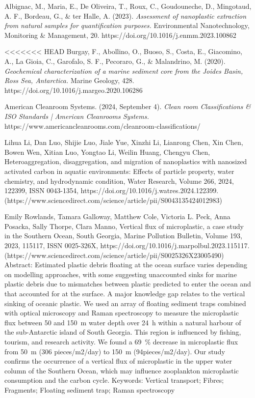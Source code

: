 \documentclass[twocolumn,a4paper,aps,amsmath,amssymb,floatfix,superscriptaddress]{revtex4-2}
\begin{document}
	\begin{thebibliography}{10}
		
		Albignac, M., Maria, E., De Oliveira, T., Roux, C., Goudouneche, D., Mingotaud, A. F., Bordeau, G., \& ter Halle, A. (2023). \textit{Assessment of nanoplastic extraction from natural samples for quantification purposes.} Environmental Nanotechnology, Monitoring \& Management, 20. https://doi.org/10.1016/j.enmm.2023.100862
		
<<<<<<< HEAD
		Burgay, F., Abollino, O., Buoso, S., Costa, E., Giacomino, A., La Gioia, C., Garofalo, S. F., Pecoraro, G., \& Malandrino, M. (2020). \textit{Geochemical characterization of a marine sediment core from the Joides Basin, Ross Sea, Antarctica.} Marine Geology, 428. https://doi.org/10.1016/j.margeo.2020.106286 
				
		American Cleanroom Systems. (2024, September 4). \textit{Clean room Classifications \& ISO Standards | American Cleanrooms Systems.} https://www.americancleanrooms.com/cleanroom-classifications/
		
		Lihua Li, Dan Luo, Shijie Luo, Jiale Yue, Xinzhi Li, Lianrong Chen, Xin Chen, Bowen Wen, Xitian Luo, Yongtao Li, Weilin Huang, Chengyu Chen,
		Heteroaggregation, disaggregation, and migration of nanoplastics with nanosized activated carbon in aquatic environments: Effects of particle property, water chemistry, and hydrodynamic condition,
		Water Research,
		Volume 266,
		2024,
		122399,
		ISSN 0043-1354,
		https://doi.org/10.1016/j.watres.2024.122399.
		(https://www.sciencedirect.com/science/article/pii/S0043135424012983)
		
		Emily Rowlands, Tamara Galloway, Matthew Cole, Victoria L. Peck, Anna Posacka, Sally Thorpe, Clara Manno,
		Vertical flux of microplastic, a case study in the Southern Ocean, South Georgia,
		Marine Pollution Bulletin,
		Volume 193,
		2023,
		115117,
		ISSN 0025-326X,
		https://doi.org/10.1016/j.marpolbul.2023.115117.
		(https://www.sciencedirect.com/science/article/pii/S0025326X23005490)
		Abstract: Estimated plastic debris floating at the ocean surface varies depending on modelling approaches, with some suggesting unaccounted sinks for marine plastic debris due to mismatches between plastic predicted to enter the ocean and that accounted for at the surface. A major knowledge gap relates to the vertical sinking of oceanic plastic. We used an array of floating sediment traps combined with optical microscopy and Raman spectroscopy to measure the microplastic flux between 50 and 150 m water depth over 24 h within a natural harbour of the sub-Antarctic island of South Georgia. This region is influenced by fishing, tourism, and research activity. We found a 69 \% decrease in microplastic flux from 50 m (306 pieces/m2/day) to 150 m (94pieces/m2/day). Our study confirms the occurrence of a vertical flux of microplastic in the upper water column of the Southern Ocean, which may influence zooplankton microplastic consumption and the carbon cycle.
		Keywords: Vertical transport; Fibres; Fragments; Floating sediment trap; Raman spectroscopy
		

\end{thebibliography}
\end{document}
